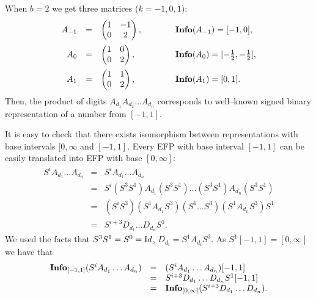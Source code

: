 \documentclass[11pt,a4paper]{article}
\begin{document}
When $b=2$ we get three matrices ($k=-1,0,1$):
	\[ \begin{array}{rclcl}
		A_{-1} &=& \begin{pmatrix} 1&-1 \\0&2 \end{pmatrix}, &\qquad&
			\textbf{Info}(A_{-1}) = [-1,0], \vspace{0.5em} \\
		A_0 &=& \begin{pmatrix} 1&0\\0&2 \end{pmatrix}, &\qquad&
			\textbf{Info}(A_0) = [-\frac{1}{2},-\frac{1}{2}], \vspace{0.5em} \\
		A_1 &=& \begin{pmatrix} 1&1\\0&2 \end{pmatrix}, &\qquad&
			\textbf{Info}(A_1) = [0,1].
    \end{array} \]
	Then, the product of digits $A_{d_1} A_{d_2} \ldots A_{d_n}$ corresponds
	to well--known signed binary representation of a number from $[-1,1]$.

It is easy to check that there exists isomorphism between representations
	with base intervals $[0,\infty$ and $[-1,1]$. Every EFP with base
	interval $[-1,1]$ can be easily translated into EFP with base $[0,\infty]$:
	\[ \begin{array}{rcl}
		S^i A_{d_1} \ldots A_{d_n} &=& S^i A_{d_1} \ldots A_{d_n} \\
		&=& S^i (S^3 S^1) A_{d_1} (S^3 S^1) \ldots (S^3 S^1) A_{d_n} (S^3 S^1) \\
		&=& (S^i S^3) (S^1 A_{d_1} S^3) (S^1 \ldots S^3) (S^1 A_{d_n} S^3) S^1 \\
		&=& S^{i+3} D_{d_1} \ldots D_{d_n} S^1.
	\end{array} \]
	We used the facts that $S^3 S^1 = S^0 = {\textrm Id}$, $D_{d_i} =
	S^1 A_{d_i} S^3$. As $S^1 [-1,1] = [0,\infty]$ we have that
	\[ \begin{array}{rcl}
		{\bf Info}_{[-1,1]} (S^i A_{d_1} \ldots A_{d_n}) &=&
			(S^i A_{d_1} \ldots A_{d_n}) [-1,1] \\
		&=& S^{i+3} D_{d_1} \ldots D_{d_n} S^1 [-1,1] \\
		&=& {\bf Info}_{[0,\infty]} (S^{i+3} D_{d_1} \ldots D_{d_n}).
	\end{array} \]
\end{document}
